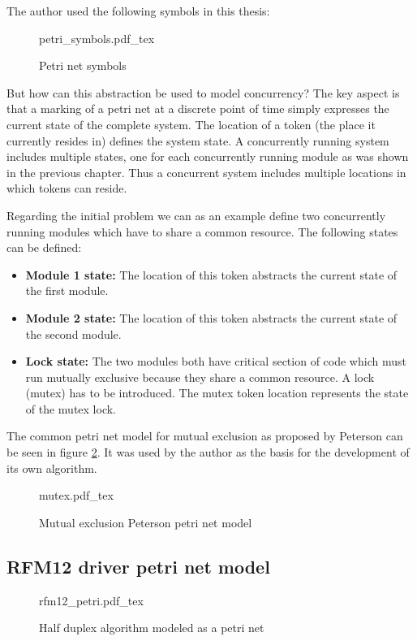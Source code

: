 The author used the following symbols in this thesis:
\begin{figure}[H]
\centering
{petri_symbols.pdf_tex}
\caption{Petri net symbols}
\label{fig:petrisymbols}
\end{figure}

But how can this abstraction be used to model concurrency? The key aspect is that a marking of a petri net at a discrete point of time simply expresses the current state of the complete system. The location of a token (the place it currently resides in) defines the system state. A concurrently running system includes multiple states, one for each concurrently running module as was shown in the previous chapter. Thus a concurrent system includes multiple locations in which tokens can reside.

Regarding the initial problem we can as an example define two concurrently running modules which have to share a common resource. The following states can be defined:

\begin{itemize}
    \item \textbf{Module 1 state:} The location of this token abstracts the current state of the first module.
    \item \textbf{Module 2 state:} The location of this token abstracts the current state of the second module.
    \item \textbf{Lock state:} The two modules both have critical section of code which must run mutually exclusive because they share a common resource. A lock (mutex) has to be introduced. The mutex token location represents the state of the mutex lock.
\end{itemize}

The common petri net model for mutual exclusion as proposed by Peterson \cite{peterson} can be seen in figure \ref{fig:petri-mutex}. It was used by the author as the basis for the development of its own algorithm.

\begin{figure}[H]
\centering
{mutex.pdf_tex}
\caption{Mutual exclusion Peterson petri net model}
\label{fig:petri-mutex}
\end{figure}

\subsection{RFM12 driver petri net model} %
\label{sub:rfm12_petri_net_model}
\begin{figure}[H]
\centering
{rfm12_petri.pdf_tex}
\caption{Half duplex algorithm modeled as a petri net}
\label{fig:petri-rfm12}
\end{figure}

